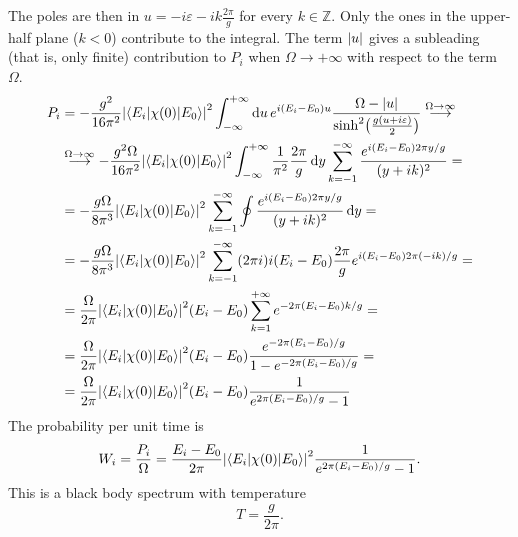 \documentclass[a4paper,12pt]{book}
\DeclarePairedDelimiter{\abs}{\lvert}{\rvert}
\newcommand{\dd}{\mathop{\mathrm{d}\!}{}}
\renewcommand{\epsilon}{\varepsilon}
\theoremstyle{definition}
\theoremstyle{remark}
\begin{document}
The poles are then in $u=-i\epsilon-ik\frac{2\pi}g$ for every $k\in\mathbb Z$. Only the ones in the upper-half plane ($k<0$) contribute to the integral. The term $\abs{u}$ gives a subleading (that is, only finite) contribution to $P_i$ when $\Omega\to+\infty$ with respect to the term $\Omega$.
\begin{align*}
P_i&=-\frac{g^2}{16\pi^2}\abs*{\braket{E_i|\chi(0)|E_0}}^2\int_{-\infty}^{+\infty}\dd u\,e^{i(E_i-E_0)u}\frac{\Omega-\abs{u}}{\sinh^2\bigl(\frac{g(u+i\epsilon)}2\bigr)}\overset{\Omega\to\infty}{\longrightarrow}\\
&\overset{\Omega\to\infty}{\longrightarrow}-\frac{g^2\Omega}{16\pi^2}\abs*{\braket{E_i|\chi(0)|E_0}}^2\int_{-\infty}^{+\infty}\frac1{\pi^2}\frac{2\pi}{g}\dd y\sum_{k=-1}^{-\infty}\frac{e^{i(E_i-E_0)2\pi y/g}}{(y+ik)^2}=\\
&=-\frac{g\Omega}{8\pi^3}\abs*{\braket{E_i|\chi(0)|E_0}}^2\sum_{k=-1}^{-\infty}\oint\frac{e^{i(E_i-E_0)2\pi y/g}}{(y+ik)^2}\dd y=\\
&=-\frac{g\Omega}{8\pi^3}\abs*{\braket{E_i|\chi(0)|E_0}}^2\sum_{k=-1}^{-\infty}(2\pi i)i(E_i-E_0)\frac{2\pi}{g}e^{i(E_i-E_0)2\pi (-ik)/g}=\\
&=\frac{\Omega}{2\pi}\abs*{\braket{E_i|\chi(0)|E_0}}^2(E_i-E_0)\sum_{k=1}^{+\infty}e^{-2\pi(E_i-E_0)k/g}=\\
&=\frac{\Omega}{2\pi}\abs*{\braket{E_i|\chi(0)|E_0}}^2(E_i-E_0)\frac{e^{-2\pi(E_i-E_0)/g}}{1-e^{-2\pi(E_i-E_0)/g}}=\\
&=\frac{\Omega}{2\pi}\abs*{\braket{E_i|\chi(0)|E_0}}^2(E_i-E_0)\frac1{e^{2\pi(E_i-E_0)/g}-1}
\end{align*}
The probability per unit time is
\[W_i=\frac{P_i}{\Omega}=\frac{E_i-E_0}{2\pi}\abs*{\braket{E_i|\chi(0)|E_0}}^2\frac1{e^{2\pi(E_i-E_0)/g}-1}.\]
This is a black body spectrum with temperature
\[T=\frac{g}{2\pi}.\]

\end{document}
